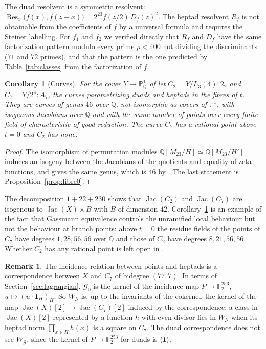 \documentclass[11pt]{amsart}
\newtheorem{corollary}[theorem]{Corollary}
\theoremstyle{definition}
\newtheorem{remark}[theorem]{Remark}
\newcommand{\QQ}{\mathbb{Q}}
\newcommand{\FF}{\mathbb{F}}
\newcommand{\PP}{\mathbb{P}}
\newcommand{\Jac}{\operatorname{Jac}}
\newcommand{\M}{M_{23}}
\newcommand{\cG}{\mathcal{G}}
\newcommand{\one}{\mathbf{1}}
\begin{document}
The duad resolvent is a symmetric resolvent: $\operatorname{Res}_x\bigl(f(x),f(z-x)\bigr)=2^{23}f(z/2)\,D_f(z)^2$. The heptad resolvent $R_f$ is not obtainable from the coefficients of $f$ by a universal formula and requires the Steiner labelling. For $f_1$ and $f_2$ we verified directly that $R_f$ and $D_f$ have the same factorization pattern modulo every prime $p<400$ not dividing the discriminants ($71$ and $72$ primes), and that the pattern is the one predicted by Table~\ref{tab:classes} from the factorization of $f$.

\begin{corollary}[Curves]\label{cor:curves}
For the cover $Y\to\PP^1_\QQ$ of \cite{HJLPPZ26} let $C_2=Y/L_3(4){:}2_2$ and $C_7=Y/2^4{:}A_7$, the curves parametrizing duads and heptads in the fibres of $t$. They are curves of genus $46$ over $\QQ$, not isomorphic as covers of $\PP^1$, with isogenous Jacobians over $\QQ$ and with the same number of points over every finite field of characteristic of good reduction. The curve $C_7$ has a rational point above $t=0$ and $C_2$ has none.
\end{corollary}
\begin{proof}
The isomorphism of permutation modules $\QQ[\M/H]\simeq\QQ[\M/H']$ induces an isogeny between the Jacobians of the quotients \cite{KR89} and equality of zeta functions, and gives the same genus, which is $46$ by \cite[Table~2]{HJLPPZ26}. The last statement is Proposition~\ref{prop:fibre0}.
\end{proof}

The decomposition $1+22+230$ shows that $\Jac(C_2)$ and $\Jac(C_7)$ are isogenous to $\Jac(X)\times B$ with $B$ of dimension $42$. Corollary~\ref{cor:curves} is an example of the fact that Gassmann equivalence controls the unramified local behaviour but not the behaviour at branch points: above $t=0$ the residue fields of the points of $C_7$ have degrees $1,28,56,56$ over $\QQ$ and those of $C_2$ have degrees $8,21,56,56$. Whether $C_2$ has any rational point is left open in \cite[Table~2]{HJLPPZ26}.

\begin{remark}
The incidence relation between points and heptads is a correspondence between $X$ and $C_7$ of bidegree $(77,7)$. In terms of Section~\ref{sec:lagrangian}, $\cG_0$ is the kernel of the incidence map $P\to\FF_2^{253}$, $u\mapsto(u\cdot\one_H)_H$. So $W_\cG$ is, up to the invariants of the cokernel, the kernel of the map $\Jac(X)[2]\to\Jac(C_7)[2]$ induced by the correspondence: a class in $\Jac(X)[2]$ represented by a function $h$ with even divisor lies in $W_\cG$ when its heptad norm $\prod_{x\in H}h(x)$ is a square on $C_7$. The duad correspondence does not see $W_\cG$, since the kernel of $P\to\FF_2^{253}$ for duads is $\langle\one\rangle$.
\end{remark}
\end{document}
